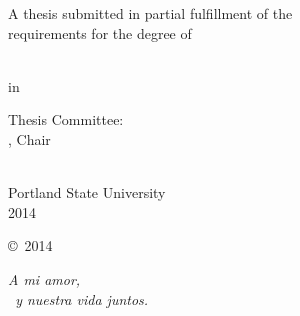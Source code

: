 \begin{SingleSpace}
\begin{center}
  A thesis submitted in partial fulfillment of the\\
  requirements for the degree of
\end{center}

\vfill

\begin{center}
  \thesisDegree\\
  in\\
  \thesisDept
\end{center}

\vfill

\begin{center}
  Thesis Committee:\\
  \thesisAdvisor, Chair\\
  \thesisCommitteeOne\\
  \thesisCommitteeTwo
\end{center}

\vfill

\begin{center}
    Portland State University\\
    2014
\end{center}
\end{SingleSpace}

\cleardoublepage  %
\thispagestyle{empty}

\begin{center}
    \vspace*{2.5 in}
    \copyright~2014 \thesisAuthor
\end{center}

\cleardoublepage



\clearpage

\vspace*{\fill}
\begin{flushright}
\SingleSpacing
{\sffamily\itshape A mi amor,\\~y nuestra vida juntos.}  %
\end{flushright}


\rmfamily
\normalfont



\clearpage
 

\begin{Spacing}{1.3}
\tableofcontents*  %



\clearpage
\listoftables

\clearpage
\listoffigures
\end{Spacing}


